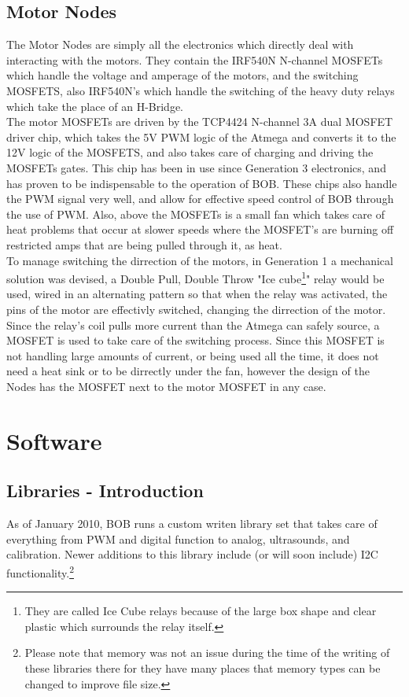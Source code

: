 \documentclass{article}
\begin{document}
\subsection{Motor Nodes}
The Motor Nodes are simply all the electronics which directly deal with interacting with the motors. They contain the IRF540N N-channel MOSFETs which handle the voltage and amperage of the motors, and the switching MOSFETS, also IRF540N's which handle the switching of the heavy duty relays which take the place of an H-Bridge.\\
The motor MOSFETs are driven by the TCP4424 N-channel 3A dual MOSFET driver chip, which takes the 5V PWM logic of the Atmega and converts it to the 12V logic of the MOSFETS, and also takes care of charging and driving the MOSFETs gates. This chip has been in use since Generation 3 electronics, and has proven to be indispensable to the operation of BOB. These chips also handle the PWM signal very well, and allow for effective speed control of BOB through the use of PWM. Also, above the MOSFETs is a small fan which takes care of heat problems that occur at slower speeds where the MOSFET's are burning off restricted amps that are being pulled through it, as heat.\\
To manage switching the dirrection of the motors, in Generation 1 a mechanical solution was devised, a Double Pull, Double Throw "Ice cube\footnote{They are called Ice Cube relays because of the large box shape and clear plastic which surrounds the relay itself.}" relay would be used, wired in an alternating pattern so that when the relay was activated, the pins of the motor are effectivly switched, changing the dirrection of the motor. Since the relay's coil pulls more current than the Atmega can safely source, a MOSFET is used to take care of the switching process. Since this MOSFET is not handling large amounts of current, or being used all the time, it does not need a heat sink or to be dirrectly under the fan, however the design of the Nodes has the MOSFET next to the motor MOSFET in any case.\\
\section{Software}
\subsection{Libraries - Introduction}
As of January 2010, BOB runs a custom writen library set that takes care of everything from PWM and digital function to analog, ultrasounds, and calibration. Newer additions to this library include (or will soon include) I2C functionality.\footnote{Please note that memory was not an issue during the time of the writing of these libraries there for they have many places that memory types can be changed to improve file size.}\\
\end{document}
